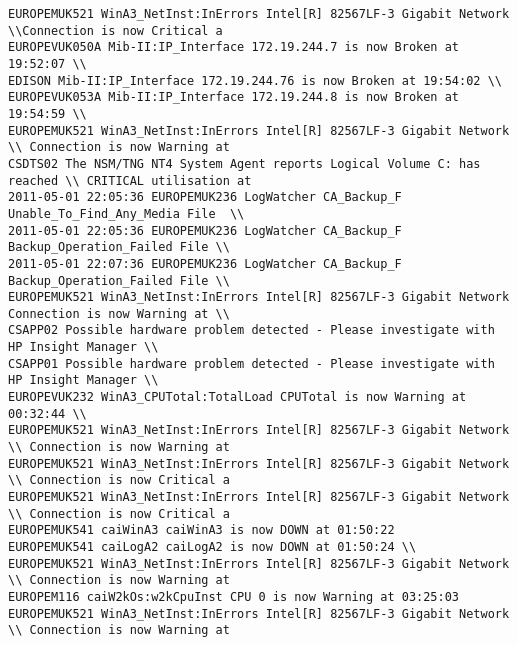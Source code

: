\begin{lstlisting}
EUROPEMUK521 WinA3_NetInst:InErrors Intel[R] 82567LF-3 Gigabit Network \\Connection is now Critical a
EUROPEVUK050A Mib-II:IP_Interface 172.19.244.7 is now Broken at 19:52:07 \\
EDISON Mib-II:IP_Interface 172.19.244.76 is now Broken at 19:54:02 \\
EUROPEVUK053A Mib-II:IP_Interface 172.19.244.8 is now Broken at 19:54:59 \\
EUROPEMUK521 WinA3_NetInst:InErrors Intel[R] 82567LF-3 Gigabit Network \\ Connection is now Warning at
CSDTS02 The NSM/TNG NT4 System Agent reports Logical Volume C: has reached \\ CRITICAL utilisation at
2011-05-01 22:05:36 EUROPEMUK236 LogWatcher CA_Backup_F Unable_To_Find_Any_Media File  \\
2011-05-01 22:05:36 EUROPEMUK236 LogWatcher CA_Backup_F   Backup_Operation_Failed File \\
2011-05-01 22:07:36 EUROPEMUK236 LogWatcher CA_Backup_F Backup_Operation_Failed File \\
EUROPEMUK521 WinA3_NetInst:InErrors Intel[R] 82567LF-3 Gigabit Network Connection is now Warning at \\
CSAPP02 Possible hardware problem detected - Please investigate with HP Insight Manager \\
CSAPP01 Possible hardware problem detected - Please investigate with HP Insight Manager \\
EUROPEVUK232 WinA3_CPUTotal:TotalLoad CPUTotal is now Warning at 00:32:44 \\
EUROPEMUK521 WinA3_NetInst:InErrors Intel[R] 82567LF-3 Gigabit Network \\ Connection is now Warning at
EUROPEMUK521 WinA3_NetInst:InErrors Intel[R] 82567LF-3 Gigabit Network \\ Connection is now Critical a
EUROPEMUK521 WinA3_NetInst:InErrors Intel[R] 82567LF-3 Gigabit Network \\ Connection is now Critical a
EUROPEMUK541 caiWinA3 caiWinA3 is now DOWN at 01:50:22
EUROPEMUK541 caiLogA2 caiLogA2 is now DOWN at 01:50:24 \\
EUROPEMUK521 WinA3_NetInst:InErrors Intel[R] 82567LF-3 Gigabit Network \\ Connection is now Warning at
EUROPEM116 caiW2kOs:w2kCpuInst CPU 0 is now Warning at 03:25:03
EUROPEMUK521 WinA3_NetInst:InErrors Intel[R] 82567LF-3 Gigabit Network \\ Connection is now Warning at

\end{lstlisting}

